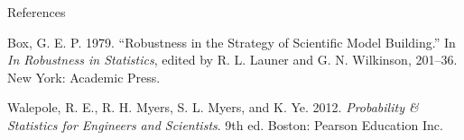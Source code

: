\documentclass[10pt,ignorenonframetext,]{beamer}
\begin{document}
\begin{frame}{References}

\hypertarget{refs}{}
\hypertarget{ref-box1979}{}
Box, G. E. P. 1979. ``Robustness in the Strategy of Scientific Model
Building.'' In \emph{In Robustness in Statistics}, edited by R. L.
Launer and G. N. Wilkinson, 201--36. New York: Academic Press.

\hypertarget{ref-walepole.etal}{}
Walepole, R. E., R. H. Myers, S. L. Myers, and K. Ye. 2012.
\emph{Probability \& Statistics for Engineers and Scientists}. 9th ed.
Boston: Pearson Education Inc.

\end{frame}
\end{document}
